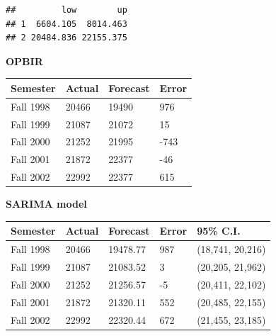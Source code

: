 \documentclass[
]{book}
\newenvironment{Shaded}{\begin{snugshade}}{\end{snugshade}}
\newcommand{\AttributeTok}[1]{\textcolor[rgb]{0.77,0.63,0.00}{#1}}
\newcommand{\ConstantTok}[1]{\textcolor[rgb]{0.00,0.00,0.00}{#1}}
\newcommand{\DecValTok}[1]{\textcolor[rgb]{0.00,0.00,0.81}{#1}}
\newcommand{\FloatTok}[1]{\textcolor[rgb]{0.00,0.00,0.81}{#1}}
\newcommand{\FunctionTok}[1]{\textcolor[rgb]{0.00,0.00,0.00}{#1}}
\newcommand{\NormalTok}[1]{#1}
\newcommand{\OtherTok}[1]{\textcolor[rgb]{0.56,0.35,0.01}{#1}}
\newcommand{\SpecialCharTok}[1]{\textcolor[rgb]{0.00,0.00,0.00}{#1}}
\theoremstyle{definition}
\theoremstyle{definition}
\theoremstyle{definition}
\theoremstyle{definition}
\theoremstyle{remark}
\begin{document}
\begin{Shaded}
\end{Shaded}

\begin{verbatim}
##         low        up
## 1  6604.105  8014.463
## 2 20484.836 22155.375
\end{verbatim}

\textbf{OPBIR}

\begin{longtable}[]{@{}llll@{}}
\toprule()
Semester & Actual & Forecast & Error \\
\midrule()
\endhead
Fall 1998 & 20466 & 19490 & 976 \\
Fall 1999 & 21087 & 21072 & 15 \\
Fall 2000 & 21252 & 21995 & -743 \\
Fall 2001 & 21872 & 22377 & -46 \\
Fall 2002 & 22992 & 22377 & 615 \\
\bottomrule()
\end{longtable}

\textbf{SARIMA model}

\begin{longtable}[]{@{}lllll@{}}
\toprule()
Semester & Actual & Forecast & Error & 95\% C.I. \\
\midrule()
\endhead
Fall 1998 & 20466 & 19478.77 & 987 & (18,741, 20,216) \\
Fall 1999 & 21087 & 21083.52 & 3 & (20,205, 21,962) \\
Fall 2000 & 21252 & 21256.57 & -5 & (20,411, 22,102) \\
Fall 2001 & 21872 & 21320.11 & 552 & (20,485, 22,155) \\
Fall 2002 & 22992 & 22320.44 & 672 & (21,455, 23,185) \\
\bottomrule()
\end{longtable}
\end{document}
